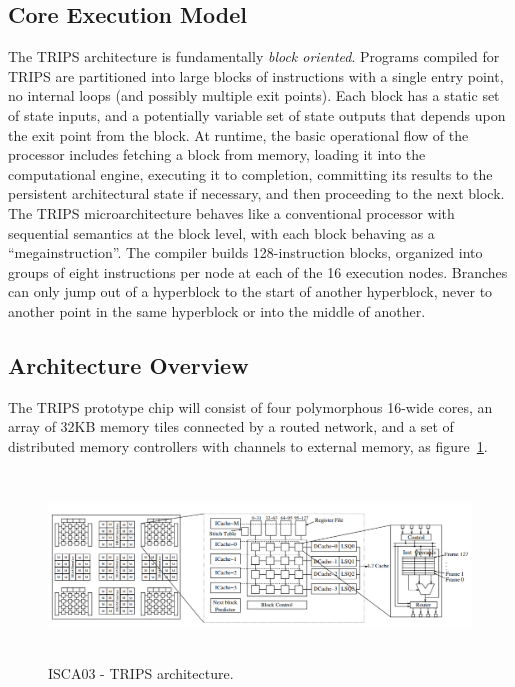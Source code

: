 \documentclass[UTF8,12pt,a4paper]{article}
\begin{document}
\subsection{Core Execution Model}
The TRIPS architecture is fundamentally \emph{block oriented}.
Programs compiled for TRIPS are partitioned into large blocks of instructions
with a single entry point, no internal loops (and possibly multiple exit points).
Each block has a static set of state inputs,
and a potentially variable set of state outputs
that depends upon the exit point from the block.
At runtime, the basic operational flow of the processor includes fetching a block from memory,
loading it into the computational engine, executing it to completion,
committing its results to the persistent architectural state if necessary,
and then proceeding to the next block.
The TRIPS microarchitecture behaves like a conventional processor with sequential semantics at the block level,
with each block behaving as a ``megainstruction''.
The compiler builds 128-instruction blocks,
organized into groups of eight instructions per node at each of the 16 execution nodes.
Branches can only jump out of a hyperblock to the start of another hyperblock,
never to another point in the same hyperblock or into the middle of another.

\subsection{Architecture Overview}
The TRIPS prototype chip will consist of four polymorphous 16-wide cores,
an array of 32KB memory tiles connected by a routed network,
and a set of distributed memory controllers with channels to external memory,
as figure~\ref{fig:trips_arch}.

\begin{figure}[htb]
  \begin{small}
    \begin{center}
      \includegraphics[width=\textwidth,height=5cm]{figures/isca03_trips_arch.png}
    \end{center}
    \caption{ISCA03 - TRIPS architecture.}
    \label{fig:trips_arch}
  \end{small}
\end{figure}
\end{document}
